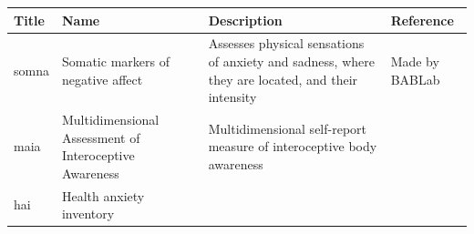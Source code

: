 \documentclass[]{book}
\begin{document}
\begin{longtable}[]{@{}llll@{}}
\toprule
\begin{minipage}[b]{0.22\columnwidth}\raggedright
Title\strut
\end{minipage} & \begin{minipage}[b]{0.27\columnwidth}\raggedright
Name\strut
\end{minipage} & \begin{minipage}[b]{0.22\columnwidth}\raggedright
Description\strut
\end{minipage} & \begin{minipage}[b]{0.18\columnwidth}\raggedright
Reference\strut
\end{minipage}\tabularnewline
\midrule
\endhead
\begin{minipage}[t]{0.22\columnwidth}\raggedright
somna\strut
\end{minipage} & \begin{minipage}[t]{0.27\columnwidth}\raggedright
Somatic markers of negative affect\strut
\end{minipage} & \begin{minipage}[t]{0.22\columnwidth}\raggedright
Assesses physical sensations of anxiety and sadness, where they are located, and their intensity\strut
\end{minipage} & \begin{minipage}[t]{0.18\columnwidth}\raggedright
Made by BABLab\strut
\end{minipage}\tabularnewline
\begin{minipage}[t]{0.22\columnwidth}\raggedright
maia\strut
\end{minipage} & \begin{minipage}[t]{0.27\columnwidth}\raggedright
Multidimensional Assessment of Interoceptive Awareness\strut
\end{minipage} & \begin{minipage}[t]{0.22\columnwidth}\raggedright
Multidimensional self-report measure of interoceptive body awareness\strut
\end{minipage} & \begin{minipage}[t]{0.18\columnwidth}\raggedright
\strut
\end{minipage}\tabularnewline
\begin{minipage}[t]{0.22\columnwidth}\raggedright
hai\strut
\end{minipage} & \begin{minipage}[t]{0.27\columnwidth}\raggedright
Health anxiety inventory\strut
\end{minipage} & \begin{minipage}[t]{0.22\columnwidth}\raggedright

\end{minipage}
\end{longtable}
\end{document}
